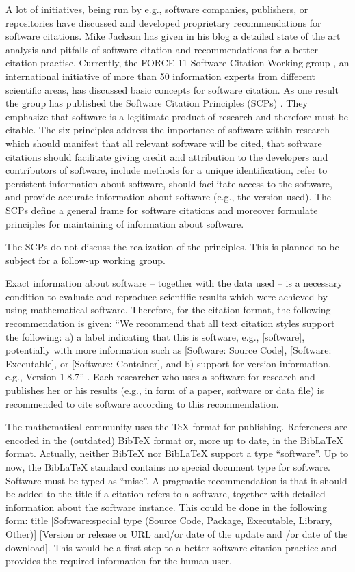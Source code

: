 \documentclass[12pt]{article}
\begin{document}
A lot of initiatives, being run by e.g., software companies, publishers, or
repositories have discussed and developed proprietary recommendations for
software citations. Mike Jackson has given in his blog \cite{Jackson} a
detailed state of the art analysis and pitfalls of software citation and
recommendations for a better citation practise. Currently, the FORCE 11
Software Citation Working group \cite{SoftwareCitationWG}, an international
initiative of more than 50 information experts from different scientific areas,
has discussed basic concepts for software citation. As one result the group has
published the Software Citation Principles (SCPs)
\cite{SoftwareCitationPrinciples}. They emphasize that software is a legitimate
product of research and therefore must be citable.  The six principles address
the importance of software within research which should manifest that all
relevant software will be cited, that software citations should facilitate
giving credit and attribution to the developers and contributors of software,
include methods for a unique identification, refer to persistent information
about software, should facilitate access to the software, and provide accurate
information about software (e.g., the version used). The SCPs define a general
frame for software citations and moreover formulate principles for maintaining
of information about software.

The SCPs do not discuss the realization of the principles.  This is planned to
be subject for a follow-up working group.

Exact information about software -- together with the data used -- is a
necessary condition to evaluate and reproduce scientific results which were
achieved by using mathematical software. Therefore, for the citation format,
the following recommendation is given: ``We recommend that all text citation
styles support the following: a) a label indicating that this is software,
e.g., [software], potentially with more information such as [Software: Source
  Code], [Software: Executable], or [Software: Container], and b) support for
version information, e.g., Version 1.8.7'' \cite{SoftwareCitationPrinciples}.
Each researcher who uses a software for research and publishes her or his
results (e.g., in form of a paper, software or data file) is recommended to
cite software according to this recommendation.

The mathematical community uses the {\TeX} format for publishing. References
are encoded in the (outdated) Bib{\TeX} format or, more up to date, in the
Bib{\LaTeX} format. Actually, neither Bib{\TeX} nor Bib{\LaTeX} support a type
``software''. Up to now, the Bib{\LaTeX} standard contains no special document
type for software. Software must be typed as ``misc''. A pragmatic
recommendation is that it should be added to the title if a citation refers to
a software, together with detailed information about the software instance.
This could be done in the following form: title [Software:special type (Source
  Code, Package, Executable, Library, Other)] [Version or release or URL and/or
  date of the update and /or date of the download]. This would be a first step
to a better software citation practice and provides the required information
for the human user.
\end{document}
